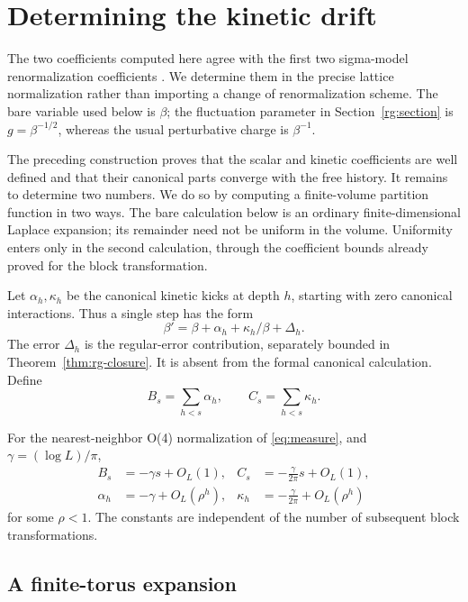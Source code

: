 \section{Determining the kinetic drift}
\label{cal:section}

The two coefficients computed here agree with the first two
sigma-model renormalization coefficients
\cite{BrezinZinnJustin,BrezinZinnJustinLeGuillou,Shin}. We determine them
in the precise lattice normalization rather than importing a change of
renormalization scheme. The bare variable used below is $\beta$;
the fluctuation parameter in Section~\ref{rg:section} is
$g=\beta^{-1/2}$, whereas the usual perturbative charge is $\beta^{-1}$.

The preceding construction proves that the scalar and kinetic
coefficients are well defined and that their canonical parts converge
with the free history. It remains to determine two numbers. We do so by
computing a finite-volume partition function in two ways. The bare
calculation below is an ordinary finite-dimensional Laplace expansion;
its remainder need not be uniform in the volume. Uniformity enters only
in the second calculation, through the coefficient bounds already
proved for the block transformation.

Let $\alpha_h,\kappa_h$ be the canonical kinetic kicks at depth $h$,
starting with zero canonical interactions. Thus a single step has the
form
\[
 \beta'=\beta+\alpha_h+\kappa_h/\beta+\Delta_h.
\]
The error $\Delta_h$ is the regular-error contribution, separately
bounded in Theorem~\ref{thm:rg-closure}. It is absent from the formal
canonical calculation. Define
\[
 B_s=\sum_{h<s}\alpha_h,\qquad C_s=\sum_{h<s}\kappa_h.
\]

\begin{theorem}
\label{thm:calibration}
For the nearest-neighbor O(4) normalization of
\eqref{eq:measure}, and $\gamma=(\log L)/\pi$,
\begin{align}
 B_s&=-\gamma s+O_L(1),&
 C_s&=-\frac{\gamma}{2\pi}s+O_L(1),\label{cal:sums}\\
 \alpha_h&=-\gamma+O_L(\rho^h),&
 \kappa_h&=-\frac{\gamma}{2\pi}+O_L(\rho^h)
 \label{cal:kicks}
\end{align}
for some $\rho<1$. The constants are independent of the number of
subsequent block transformations.
\end{theorem}

\subsection{A finite-torus expansion}

